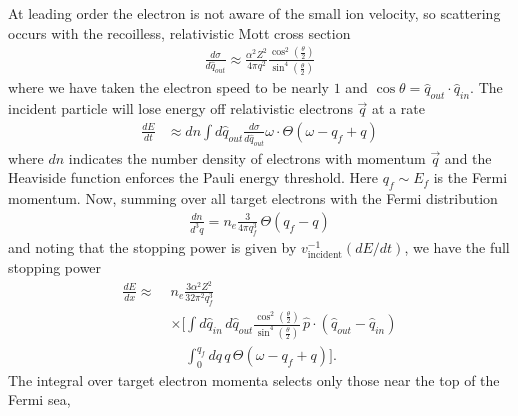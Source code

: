 \documentclass[twocolumn, preprintnumbers,amsmath,amssymb,prd, superscriptaddress]{revtex4}
\begin{document}
\begin{appendices}
At leading order the electron is not aware of the small ion velocity, so scattering occurs with the recoilless, relativistic Mott cross section
\begin{align}
    \frac{d\sigma}{d\hat{q}_{out}} \approx \frac{\alpha^2 Z^2}{4\pi q^2}
    \frac{\cos^2\left(\frac{\theta}{2}\right)}
    {\sin^4\left(\frac{\theta}{2}\right)}
\end{align}
where we have taken the electron speed to be nearly $1$ and $\cos\theta = \hat{q}_{out} \cdot \hat{q}_{in}$.
The incident particle will lose energy off relativistic electrons $\vec{q}$ at a rate
\begin{align}
  \frac{dE}{dt} &\approx dn \int d{\hat{q}_{out}}
    \frac{d\sigma}{d\hat{q}_{out}} \omega \cdot
    \Theta\left(\omega - q_f + q\right)
\end{align}
where $dn$ indicates the number density of electrons with momentum $\vec{q}$ and the Heaviside function enforces the Pauli energy threshold.
Here $q_f \sim E_f$ is the Fermi momentum.
Now, summing over all target electrons with the Fermi distribution
\begin{align}
  \frac{dn}{d^3q} = n_e \frac{3}{4\pi q_f^3} \, \Theta(q_f - q)
\end{align}
and noting that the stopping power is given by $v_\text{incident}^{-1} (dE/dt)$, we have the full stopping power
\begin{align}
  \label{eq:StoppingPowerIntegral}
  \frac{dE}{dx} \approx \; &n_e \frac{3 \alpha^2 Z^2}{32 \pi^2 q_f^3}
   \nonumber\\
  &  \times \Bigg[ \int d\hat{q}_{in} \, d\hat{q}_{out}
   \frac{\cos^2\left(\frac{\theta}{2}\right)}
        {\sin^4\left(\frac{\theta}{2}\right)}
   \, \hat{p} \cdot \left(\hat{q}_{out} - \hat{q}_{in}\right) \nonumber \\
  &\phantom{ \times \Bigg[ }\int_0^{q_f} dq \, q \, \Theta\left(\omega - q_f + q\right)
     \Bigg] .
\end{align}
The integral over target electron momenta selects only those near the top of the Fermi sea,

\end{appendices}
\end{document}
